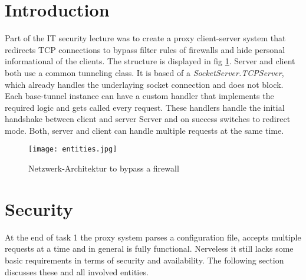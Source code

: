 \documentclass[12pt, a4paper]{scrartcl}
\begin{document}


\tableofcontents
\newpage
{}
\setcounter{lastroman}{\value{page}}

\pagestyle{plain}
\maketitle

\section{Introduction}
Part of the IT security lecture was to create a proxy client-server system that redirects TCP connections to bypass filter rules of firewalls and hide personal informational of the clients. The structure is displayed in fig \ref{fig::arch}. \newline
Server and client both use a common tunneling class. It is based of a \textit{SocketServer.TCPServer}, which already handles the underlaying socket connection and does not block. Each base-tunnel instance can have a custom handler that implements the required logic and gets called every request. These handlers handle the initial handshake between client and server Server and on success switches to redirect mode. Both, server and client can handle multiple requests at the same time.

\begin{figure}[H]
    \centering
    \texttt{[image: entities.jpg]}
    \caption{Netzwerk-Architektur to bypass a firewall}
    \label{fig::arch}
\end{figure}

\newpage
\section{Security}
At the end of task 1 the proxy system parses a configuration file, accepts multiple requests at a time and in general is fully functional. Nerveless it still lacks some basic requirements in terms of security and availability. The following section discusses these and all involved entities.
\end{document}
